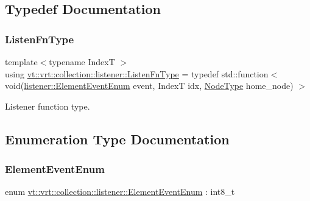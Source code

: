 \subsection{Typedef Documentation}
\mbox{\label{namespacevt_1_1vrt_1_1collection_1_1listener_a0f35a1b6c7c88d9543939a204f418d7a}} 
\subsubsection{\texorpdfstring{Listen\+Fn\+Type}{ListenFnType}}
{\footnotesize\ttfamily template$<$typename IndexT $>$ \\
using \hyperlink{namespacevt_1_1vrt_1_1collection_1_1listener_a0f35a1b6c7c88d9543939a204f418d7a}{vt\+::vrt\+::collection\+::listener\+::\+Listen\+Fn\+Type} = typedef std\+::function$<$ void(\hyperlink{namespacevt_1_1vrt_1_1collection_1_1listener_a96ace4b58b3d91759e7abda5cc33b012}{listener\+::\+Element\+Event\+Enum} event, IndexT idx, \hyperlink{namespacevt_a866da9d0efc19c0a1ce79e9e492f47e2}{Node\+Type} home\+\_\+node) $>$}



Listener function type. 



\subsection{Enumeration Type Documentation}
\mbox{\label{namespacevt_1_1vrt_1_1collection_1_1listener_a96ace4b58b3d91759e7abda5cc33b012}} 
\subsubsection{\texorpdfstring{Element\+Event\+Enum}{ElementEventEnum}}
{\footnotesize\ttfamily enum \hyperlink{namespacevt_1_1vrt_1_1collection_1_1listener_a96ace4b58b3d91759e7abda5cc33b012}{vt\+::vrt\+::collection\+::listener\+::\+Element\+Event\+Enum} \+: int8\+\_\+t\hspace{0.3cm}{\ttfamily [strong]}}



